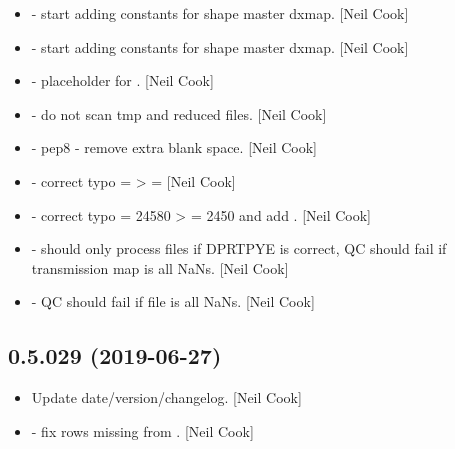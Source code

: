 \documentclass[a4paper,10pt,english]{report}
\begin{document}
\begin{itemize}
\item {} 
 - start adding constants for shape master
dxmap. {[}Neil Cook{]}

\item {} 
 - start adding constants for shape master dxmap.
{[}Neil Cook{]}

\item {} 
 - placeholder for . {[}Neil
Cook{]}

\item {} 
 - do not scan tmp and reduced files. {[}Neil Cook{]}

\item {} 
 - pep8 - remove extra blank space. {[}Neil Cook{]}

\item {} 
 - correct typo  = 
\textendash{}\textgreater{}  =  {[}Neil Cook{]}

\item {} 
 - correct typo  = 24580 \textendash{}\textgreater{}
 = 2450 and add . {[}Neil
Cook{]}

\item {} 
  - should only process files if
DPRTPYE is correct, QC should fail if transmission map is all NaNs.
{[}Neil Cook{]}

\item {} 
 - QC should fail if file is all NaNs. {[}Neil
Cook{]}

\end{itemize}


\subsection{0.5.029 (2019-06-27)}
\label{\detokenize{misc/changelog:id108}}\begin{itemize}
\item {} 
Update date/version/changelog. {[}Neil Cook{]}

\item {} 
 - fix rows missing from . {[}Neil Cook{]}

\end{itemize}
\end{document}
